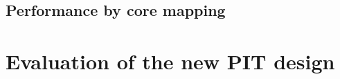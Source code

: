 \documentclass[12pt,a4paper,twoside]{book}
\begin{document}
\subsection{Performance by core mapping}\label{sec:test.multicore.performance}

\section{Evaluation of the new PIT design}\label{sec:test.pit}

\end{document}
